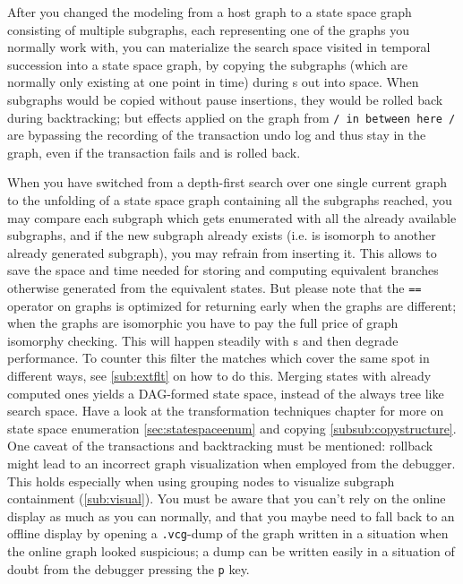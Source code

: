 After you changed the modeling from a host graph to a state space graph consisting of multiple subgraphs, each representing one of the graphs you normally work with, 
you can materialize the search space visited in temporal succession into a state space graph,
by copying the subgraphs (which are normally only existing at one point in time) during s out into space.
When subgraphs would be copied without pause insertions, they would be rolled back during backtracking; but effects applied on the graph from \texttt{/ in between here /} are bypassing the recording of the transaction undo log and thus stay in the graph, even if the transaction fails and is rolled back. 

When you have switched from a depth-first search over one single current graph to the unfolding of a state space graph containing all the subgraphs reached, you may compare each subgraph which gets enumerated with all the already available subgraphs, and if the new subgraph already exists (i.e. is isomorph to another already generated subgraph), you may refrain from inserting it.
This  allows to save the space and time needed for storing and computing equivalent branches otherwise generated from the equivalent states. 
But please note that the \texttt{==} operator on graphs is optimized for returning early when the graphs are different; when the graphs are isomorphic you have to pay the full price of graph isomorphy checking.
This will happen steadily with s and then degrade performance.
To counter this filter the matches which cover the same spot in different ways, see \ref{sub:extflt} on how to do this.
Merging states with already computed ones yields a DAG-formed state space, instead of the always tree like search space.
Have a look at the transformation techniques chapter for more on state space enumeration \ref{sec:statespaceenum} and copying \ref{subsub:copystructure}.
One caveat of the transactions and backtracking must be mentioned: rollback might lead to an incorrect graph visualization when employed from the debugger.
This holds especially when using grouping nodes to visualize subgraph containment (\ref{sub:visual}). You must be aware that you can't rely on the online display as much as you can normally, and that you maybe need to fall back to an offline display by opening a \texttt{.vcg}-dump of the graph written in a situation when the online graph looked suspicious; a dump can be written easily in a situation of doubt from the debugger pressing the \texttt{p} key. 

